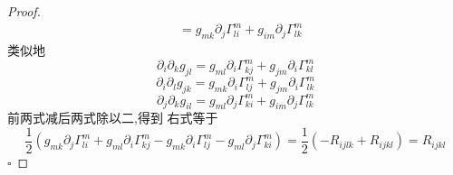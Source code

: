 \documentclass[../../几何与拓扑.tex]{subfiles}
\begin{document}
\begin{proof}
\[\begin{aligned}
        & = g_{m k} \partial _{j} \Gamma _{li}^{m}+  g_{ im }\partial _{j} \Gamma _{lk}^{m}   
 \end{aligned}
  \]类似地 \[
  \partial _{i}\partial _{k}g_{jl}= g_{ml} \partial _{i}  \Gamma _{kj}^{m}+ g_{jm}\partial _{i} \Gamma _{kl}^{m}
  \] \[
  \partial _{i}\partial _{l}g_{jk}= g_{mk} \partial _{i} \Gamma _{lj}^{m}+ g_{jm}\partial _{i} \Gamma _{lk}^{m}
  \]
  \[
  \partial _{j}\partial _{k}g_{il}= g_{ml}\partial _{j} \Gamma _{ki}^{m}+ g_{im}\partial _{j} \Gamma _{lk}^{m}
  \]前两式减后两式除以二,得到 右式等于 \[
  \frac{1}{2}\left( g_{m k}\partial _{j} \Gamma _{li}^{m}+ g_{ml}\partial _{i} \Gamma _{kj}^{m} -g _{m k}\partial _{i} \Gamma _{lj}^{m}-g_{ml}\partial _{j} \Gamma _{ki}^{m}\right)=  \frac{1}{2}\left( -R_{ijlk}+ R_{ijkl} \right) = R_{ijkl} 
  \]
    \hfill $\square$
\end{proof}
\end{document}
